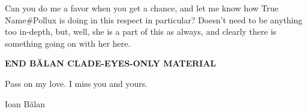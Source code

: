 Can you do me a favor when you get a chance, and let me know how True Name\#Pollux is doing in this respect in particular? Doesn't need to be anything too in-depth, but, well, she is a part of this as always, and clearly there is something going on with her here.

\textbf{END BĂLAN CLADE-EYES-ONLY MATERIAL}

Pass on my love. I miss you and yours.

Ioan Bălan
